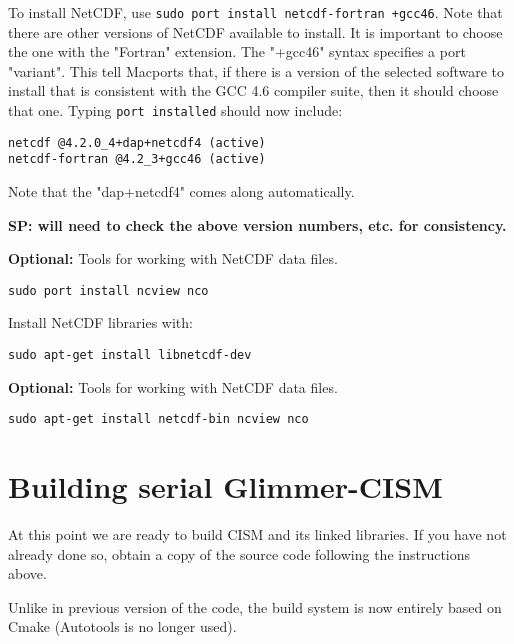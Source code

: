 \begin{mdframed}[style=mac] %
To install NetCDF, use \texttt{sudo port install netcdf-fortran +gcc46}. 
Note that there are other versions of NetCDF available to install. It is important 
to choose the one with the "Fortran" extension. The "+gcc46" syntax specifies a port "variant". 
This tell Macports that, if there is a version of the selected software 
to install that is consistent with the GCC 4.6 compiler suite, then it should 
choose that one. Typing \texttt{port installed} should now include:

\begin{verbatim}
netcdf @4.2.0_4+dap+netcdf4 (active)
netcdf-fortran @4.2_3+gcc46 (active)
\end{verbatim}

Note that the "dap+netcdf4" comes along automatically. 

\textbf{SP: will need to check the above version numbers, etc. for consistency.}

\textbf{Optional:} Tools for working with NetCDF data files.

\texttt{sudo port install ncview nco}

\end{mdframed}              %


\begin{mdframed}[style=ubuntu] %
Install NetCDF libraries with:

\texttt{sudo apt-get install libnetcdf-dev}

\textbf{Optional:} Tools for working with NetCDF data files.

\texttt{sudo apt-get install netcdf-bin ncview nco}
\end{mdframed}                 %



\section{Building serial Glimmer-CISM}
\label{serial-build}
At this point we are ready to build CISM and its linked libraries.  If you have not already done so,
obtain a copy of the source code following the instructions above.

Unlike in previous version of the code, the build system is now entirely based on Cmake 
(Autotools is no longer used). 

